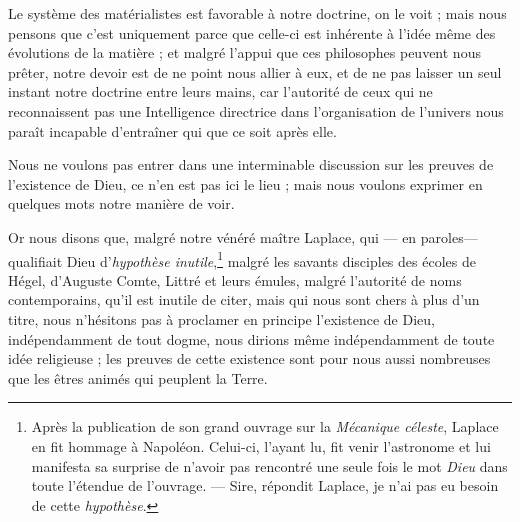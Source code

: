 \documentclass[a4paper, 11pt, oneside, landscape]{article}
\begin{document}
Le système des matérialistes est favorable à notre doctrine, on le voit ; mais nous pensons que c'est uniquement parce que celle-ci est inhérente à l'idée même des évolutions de la matière ; et malgré l'appui que ces philosophes peuvent nous prêter, notre devoir est de ne point nous allier à eux, et de ne pas laisser un seul instant notre doctrine entre leurs mains, car l'autorité de ceux qui ne reconnaissent pas une Intelligence directrice dans l'organisation de l'univers nous paraît incapable d'entraîner qui que ce soit après elle.

Nous ne voulons pas entrer dans une interminable discussion sur les preuves de l'existence de Dieu, ce n'en est pas ici le lieu ; mais nous voulons exprimer en quelques mots notre manière de voir.

Or nous disons que, malgré notre vénéré maître Laplace, qui --- en paroles--- qualifiait Dieu d'\emph{hypothèse inutile},\footnote{Après la publication de son grand ouvrage sur la \emph{Mécanique céleste}, Laplace en fit hommage à Napoléon. Celui-ci, l'ayant lu, fit venir l'astronome et lui manifesta sa surprise de n'avoir pas rencontré une seule fois le mot \emph{Dieu} dans toute l'étendue de l'ouvrage. --- Sire, répondit Laplace, je n'ai pas eu besoin de cette \emph{hypothèse}.} malgré les savants disciples des écoles de Hégel, d'Auguste Comte, Littré et leurs émules, malgré l'autorité de noms contemporains, qu'il est inutile de citer, mais qui nous sont chers à plus d'un titre, nous n'hésitons pas à proclamer en principe l'existence de Dieu, indépendamment de tout dogme, nous dirions même indépendamment de toute idée religieuse ; les preuves de cette existence sont pour nous aussi nombreuses que les êtres animés qui peuplent la Terre.
\end{document}

